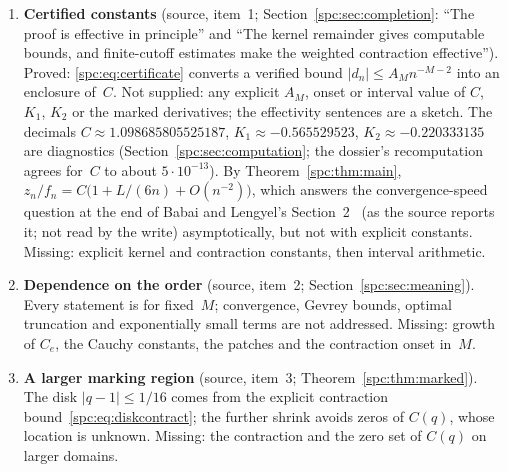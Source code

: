 \documentclass[11pt,letterpaper]{article}
\theoremstyle{definition}\newtheorem{definition}[theorem]{Definition}
\theoremstyle{remark}\newtheorem{remark}[theorem]{Remark}
\begin{document}
\begin{enumerate}
\item\label{spc:q:certified} \textbf{Certified constants} (source, item~1;
 Section~\ref{spc:sec:completion}: ``The proof is effective in principle''
 and ``The kernel remainder gives computable bounds, and finite-cutoff
 estimates make the weighted contraction effective''). Proved:
 \eqref{spc:eq:certificate} converts a verified bound
 $|d_n|\le A_Mn^{-M-2}$ into an enclosure of~$C$. Not supplied: any explicit
 $A_M$, onset or interval value of $C$, $K_1$, $K_2$ or the marked
 derivatives; the effectivity sentences are a sketch. The decimals
 $C\approx1.098685805525187$, $K_1\approx-0.565529523$,
 $K_2\approx-0.220333135$ are diagnostics (Section~\ref{spc:sec:computation};
 the dossier's recomputation agrees for~$C$ to about $5\cdot10^{-13}$). By
 Theorem~\ref{spc:thm:main}, $z_n/f_n=C\bigl(1+L/(6n)+O(n^{-2})\bigr)$, which
 answers the convergence-speed question at the end of Babai and Lengyel's
 Section~2~\cite{BabaiLengyel} (as the source reports it; not read by the
 write) asymptotically, but not with explicit constants. Missing: explicit
 kernel and contraction constants, then interval arithmetic.
\item\label{spc:q:order} \textbf{Dependence on the order} (source, item~2;
 Section~\ref{spc:sec:meaning}). Every statement is for fixed~$M$;
 convergence, Gevrey bounds, optimal truncation and exponentially small terms
 are not addressed. Missing: growth of $C_e$, the Cauchy constants, the
 patches and the contraction onset in~$M$.
\item\label{spc:q:disk} \textbf{A larger marking region} (source, item~3;
 Theorem~\ref{spc:thm:marked}). The disk $|q-1|\le1/16$ comes from the
 explicit contraction bound~\eqref{spc:eq:diskcontract}; the further shrink
 avoids zeros of $C(q)$, whose location is unknown. Missing: the contraction
 and the zero set of $C(q)$ on larger domains.


\end{enumerate}
\end{document}
